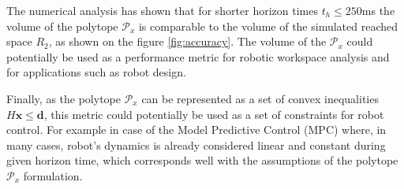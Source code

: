 The numerical analysis has shown that for shorter horizon times $t_h\leq250$ms the volume of the polytope $\mathcal{P}_x$ is comparable to the volume of the simulated reached space $R_2$, as shown on the figure \ref{fig:accuracy}. The volume of the $\mathcal{P}_x$ could potentially be used as a performance metric for robotic workspace analysis and for applications such as robot design.

Finally, as the polytope $\mathcal{P}_x$ can be represented as a set of convex inequalities $H\bm{x}\leq\bm{d}$, this metric could potentially be used as a set of constraints for robot control. For example in case of the Model Predictive Control (MPC) where, in many cases, robot's dynamics is already considered linear and constant during given horizon time, which corresponds well with the assumptions of the polytope $\mathcal{P}_x$ formulation. 





